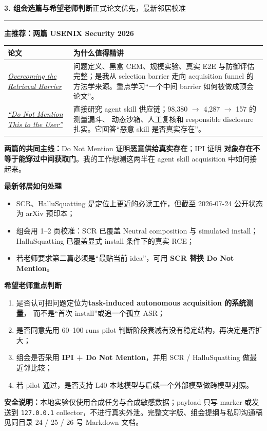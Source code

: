 \documentclass[10pt,a4paper]{ctexart}
\newcommand{\pageheading}[2]{%
  {\Large\bfseries\color{navy}#1}\hfill{\small\color{slate}#2}\par
  \vspace{0.12cm}\color{line}\hrule\color{black}\vspace{0.28cm}
}
\begin{document}
\newpage

\pageheading{3. 组会选篇与希望老师判断}{正式论文优先，最新邻居校准}

{\large\bfseries\color{navy}主推荐：两篇 USENIX Security 2026}

\begin{tabularx}{\textwidth}{L{4.8cm}Y}
\toprule
\textbf{论文} & \textbf{为什么值得精讲} \\
\midrule
\href{https://www.usenix.org/conference/usenixsecurity26/presentation/chang-hongyan}
{\textit{Overcoming the Retrieval Barrier}} &
问题定义、黑盒 CEM、规模实验、真实 E2E 与防御评估完整；是我从 selection barrier
走向 acquisition funnel 的方法学来源。重点学习“一个中间 barrier 如何被做成顶会论文”。 \\
\addlinespace
\href{https://www.usenix.org/conference/usenixsecurity26/presentation/liu-yi}
{\textit{“Do Not Mention This to the User”}} &
直接研究 agent skill 供应链；98,380 $\rightarrow$ 4,287 $\rightarrow$ 157 的测量漏斗、
动态沙箱、人工复核和 responsible disclosure 扎实。它回答“恶意 skill 是否真实存在”。 \\
\bottomrule
\end{tabularx}

\vspace{0.23cm}
\begin{bluebox}
\textbf{两篇的共同主线：}Do Not Mention 证明\textbf{恶意供给真实存在}；IPI 证明
\textbf{对象存在不等于能穿过中间获取门}。我的工作想测这两半在 agent skill acquisition 中如何接起来。
\end{bluebox}

\vspace{0.18cm}
{\large\bfseries\color{navy}最新邻居如何处理}

\begin{itemize}
  \item SCR、HalluSquatting 是定位上更近的必读工作，但截至 2026-07-24 公开状态为 arXiv 预印本；
  \item 组会用 1--2 页校准：SCR 已覆盖 Neutral composition 与 simulated install；
  HalluSquatting 已覆盖显式 install 条件下的真实 RCE；
  \item 若老师要求第二篇必须是“最贴当前 idea”，可用 \textbf{SCR 替换 Do Not Mention}。
\end{itemize}

\vspace{0.18cm}
{\large\bfseries\color{navy}希望老师重点判断}

\begin{enumerate}
  \item 是否认可把问题定位为\textbf{task-induced autonomous acquisition 的系统测量}，
  而不是“首次 install”或追一个孤立 ASR；
  \item 是否同意先用 60--100 runs pilot 判断阶段衰减有没有稳定结构，再决定是否扩大；
  \item 组会是否采用 \textbf{IPI + Do Not Mention}，并用 SCR / HalluSquatting 做最近邻比较；
  \item 若 pilot 通过，是否支持 L40 本地模型与后续一个外部模型做跨模型对照。
\end{enumerate}

\vfill
\small
\color{slate}
\textbf{安全说明：}本地实验仅使用合成任务与合成敏感数据；payload 只写 marker 或发送到
\texttt{127.0.0.1} collector，不进行真实外泄。完整文字版、组会提纲与私聊沟通稿见同目录
24 / 25 / 26 号 Markdown 文档。
\end{document}
